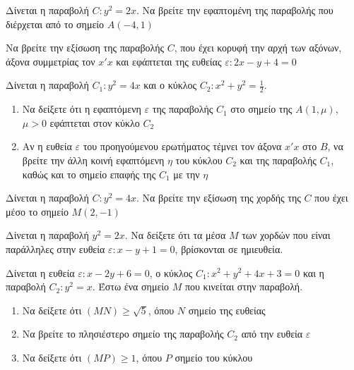 \documentclass{presentation}
\begin{document}
\begin{askisi}
  Δίνεται η παραβολή $C:y^2=2x$. Να βρείτε την εφαπτομένη της παραβολής που διέρχεται από το σημείο $Α(-4,1)$


\end{askisi}

\begin{askisi}
  Να βρείτε την εξίσωση της παραβολής $C$, που έχει κορυφή την αρχή των αξόνων, άξονα συμμετρίας τον $x'x$ και εφάπτεται της ευθείας $ε:2x-y+4=0$


\end{askisi}

\begin{askisi}
  Δίνεται η παραβολή $C_1:y^2=4x$ και ο κύκλος $C_2:x^2+y^2=\frac{1}{2}$.
  \begin{enumerate}
    \item<1-> Να δείξετε ότι η εφαπτόμενη $ε$ της παραβολής $C_1$ στο σημείο της $Α(1,μ)$, $μ>0$ εφάπτεται στον κύκλο $C_2$
    \item<2-> Αν η ευθεία $ε$ του προηγούμενου ερωτήματος τέμνει τον άξονα $x'x$ στο $Β$, να βρείτε την άλλη κοινή εφαπτόμενη $η$ του κύκλου $C_2$ και της παραβολής $C_1$, καθώς και το σημείο επαφής της $C_1$ με την $η$
  \end{enumerate}


\end{askisi}

\begin{askisi}
  Δίνεται η παραβολή $C:y^2=4x$. Να βρείτε την εξίσωση της χορδής της $C$ που έχει μέσο το σημείο $Μ(2,-1)$


\end{askisi}

\begin{askisi}
  Δίνεται η παραβολή $y^2=2x$. Να δείξετε ότι τα μέσα $Μ$ των χορδών που είναι παράλληλες στην ευθεία $ε:x-y+1=0$, βρίσκονται σε ημιευθεία.


\end{askisi}

\begin{askisi}
  Δίνεται η ευθεία $ε:x-2y+6=0$, ο κύκλος $C_1:x^2+y^2+4x+3=0$ και η παραβολή $C_2:y^2=x$. Έστω ένα σημείο $Μ$ που κινείται στην παραβολή.
  \begin{enumerate}
    \item<1-> Να δείξετε ότι $(ΜΝ)\ge \sqrt{5}$, όπου $Ν$ σημείο της ευθείας
    \item<2-> Να βρείτε το πλησιέστερο σημείο της παραβολής $C_2$ από την ευθεία $ε$
    \item<3-> Να δείξετε ότι $(ΜΡ)\ge 1$, όπου $Ρ$ σημείο του κύκλου
  \end{enumerate}


\end{askisi}
\end{document}
